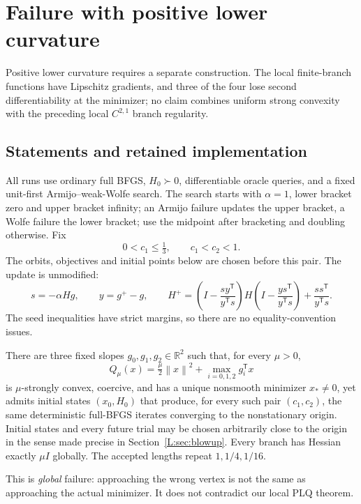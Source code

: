 \chapter{Failure with positive lower curvature}\label{comp:L}\label{L:chapter}
\renewcommand{\ModuleTag}{13}
Positive lower curvature requires a separate construction. The local finite-branch functions have Lipschitz gradients, and three of the four lose second differentiability at the minimizer; no claim combines uniform strong convexity with the preceding local $C^{2,1}$ branch regularity.


\begingroup
\providecommand{\R}{}
\renewcommand{\R}{\mathbb R}
\providecommand{\T}{}
\renewcommand{\T}{^{\mathsf T}}
\providecommand{\norm}{}
\renewcommand{\norm}[1]{\left\lVert#1\right\rVert}
\providecommand{\ip}{}
\renewcommand{\ip}[2]{\langle #1,#2\rangle}
\setcounter{section}{0}
\setcounter{theorem}{0}
\setcounter{lemma}{0}
\setcounter{corollary}{0}
\setcounter{proposition}{0}
\setcounter{remark}{0}
\setcounter{equation}{0}


\section{Statements and retained implementation}

All runs use ordinary full BFGS, $H_0\succ0$, differentiable oracle queries, and a fixed unit-first Armijo--weak-Wolfe search. The search starts with $\alpha=1$, lower bracket zero and upper bracket infinity; an Armijo failure updates the upper bracket, a Wolfe failure the lower bracket; use the midpoint after bracketing and doubling otherwise. Fix
\[
 0<c_1\le\tfrac13,\qquad c_1<c_2<1.
\]
The orbits, objectives and initial points below are chosen before this pair.
The update is unmodified:
\[
 s=-\alpha Hg,\qquad y=g^+-g,\qquad
 H^+=\left(I-\frac{sy\T}{y\T s}\right)H
 \left(I-\frac{ys\T}{y\T s}\right)+\frac{ss\T}{y\T s}.
\]
The seed inequalities have strict margins, so there are no equality-convention issues.

\begin{theorem}\label{L:thm:global}
There are three fixed slopes $g_0,g_1,g_2\in\R^2$ such that, for every $\mu>0$,
\[
 Q_\mu(x)=\tfrac\mu2\norm{x}^2+\max_{i=0,1,2}g_i\T x
\]
is $\mu$-strongly convex, coercive, and has a unique nonsmooth minimizer $x_*\ne0$, yet admits initial states $(x_0,H_0)$ that produce, for every such pair $(c_1,c_2)$, the same deterministic full-BFGS iterates converging to the nonstationary origin. Initial states and every future trial may be chosen arbitrarily close to the origin in the sense made precise in Section~\ref{L:sec:blowup}. Every branch has Hessian exactly $\mu I$ globally. The accepted lengths repeat $1,1/4,1/16$.
\end{theorem}
\noindent This is \emph{global} failure: approaching the wrong vertex is not the same as approaching the actual minimizer. It does not contradict our local PLQ theorem.

